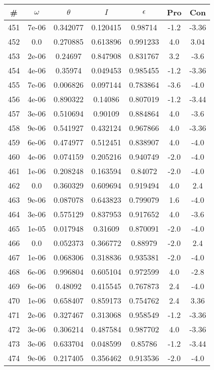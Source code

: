 \begin{table}
\begin{tabular}{c|c|c|c|c|c|c}
\# & $\omega$ & $\theta$ & $I$ & $\epsilon$ & Pro & Con\\
\hline
451 & 7e-06 & 0.342077 & 0.120415 & 0.98714 & -1.2 & -3.36\\
452 & 0.0 & 0.270885 & 0.613896 & 0.991233 & 4.0 & 3.04\\
453 & 2e-06 & 0.24697 & 0.847908 & 0.831767 & 3.2 & -3.6\\
454 & 4e-06 & 0.35974 & 0.049453 & 0.985455 & -1.2 & -3.36\\
455 & 7e-06 & 0.006826 & 0.097144 & 0.783864 & -3.6 & -4.0\\
456 & 4e-06 & 0.890322 & 0.14086 & 0.807019 & -1.2 & -3.44\\
457 & 3e-06 & 0.510694 & 0.90109 & 0.884864 & 4.0 & -3.6\\
458 & 9e-06 & 0.541927 & 0.432124 & 0.967866 & 4.0 & -3.36\\
459 & 6e-06 & 0.474977 & 0.512451 & 0.838907 & 4.0 & -4.0\\
460 & 4e-06 & 0.074159 & 0.205216 & 0.940749 & -2.0 & -4.0\\
461 & 1e-06 & 0.208248 & 0.163594 & 0.84072 & -2.0 & -4.0\\
462 & 0.0 & 0.360329 & 0.609694 & 0.919494 & 4.0 & 2.4\\
463 & 9e-06 & 0.087078 & 0.643823 & 0.799079 & 1.6 & -4.0\\
464 & 3e-06 & 0.575129 & 0.837953 & 0.917652 & 4.0 & -3.6\\
465 & 1e-05 & 0.017948 & 0.31609 & 0.870091 & -2.0 & -4.0\\
466 & 0.0 & 0.052373 & 0.366772 & 0.88979 & -2.0 & 2.4\\
467 & 1e-06 & 0.068306 & 0.318836 & 0.935381 & -2.0 & -4.0\\
468 & 6e-06 & 0.996804 & 0.605104 & 0.972599 & 4.0 & -2.8\\
469 & 6e-06 & 0.48092 & 0.415545 & 0.767873 & 2.4 & -4.0\\
470 & 1e-06 & 0.658407 & 0.859173 & 0.754762 & 2.4 & 3.36\\
471 & 2e-06 & 0.327467 & 0.313068 & 0.958549 & -1.2 & -3.36\\
472 & 3e-06 & 0.306214 & 0.487584 & 0.987702 & 4.0 & -3.36\\
473 & 3e-06 & 0.633704 & 0.048599 & 0.85786 & -1.2 & -3.44\\
474 & 9e-06 & 0.217405 & 0.356462 & 0.913536 & -2.0 & -4.0\\

\end{tabular}
\end{table}

